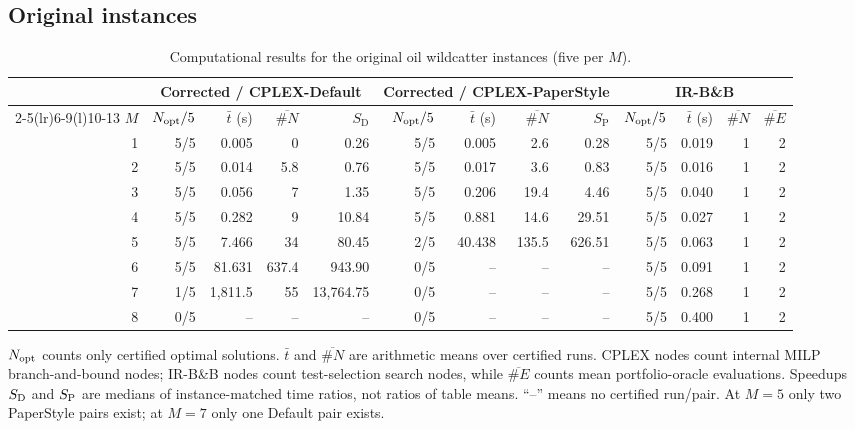 \documentclass[11pt,a4paper]{article}
\begin{document}
\subsection{Original instances}\label{sec:orig}
\begin{table}[H]
\centering
\begin{threeparttable}
\caption{Computational results for the original oil wildcatter instances (five per $M$).}\label{tab:orig}
\setlength{\tabcolsep}{2.5pt}
{\scriptsize
\begin{tabular}{r rrrr rrrr rrrr}
\toprule
 & \multicolumn{4}{c}{Corrected / CPLEX-Default} & \multicolumn{4}{c}{Corrected / CPLEX-PaperStyle} & \multicolumn{4}{c}{IR-B\&B} \\
\cmidrule(lr){2-5}\cmidrule(lr){6-9}\cmidrule(l){10-13}
$M$ & $N_{\rm opt}/5$ & $\bar t$ (s) & $\overline{\#N}$ & $S_\mathrm{D}$
& $N_{\rm opt}/5$ & $\bar t$ (s) & $\overline{\#N}$ & $S_\mathrm{P}$
& $N_{\rm opt}/5$ & $\bar t$ (s) & $\overline{\#N}$ & $\overline{\#E}$ \\
\midrule
1 & 5/5 & 0.005 & 0 & 0.26 & 5/5 & 0.005 & 2.6 & 0.28 & 5/5 & 0.019 & 1 & 2 \\
2 & 5/5 & 0.014 & 5.8 & 0.76 & 5/5 & 0.017 & 3.6 & 0.83 & 5/5 & 0.016 & 1 & 2 \\
3 & 5/5 & 0.056 & 7 & 1.35 & 5/5 & 0.206 & 19.4 & 4.46 & 5/5 & 0.040 & 1 & 2 \\
4 & 5/5 & 0.282 & 9 & 10.84 & 5/5 & 0.881 & 14.6 & 29.51 & 5/5 & 0.027 & 1 & 2 \\
5 & 5/5 & 7.466 & 34 & 80.45 & 2/5 & 40.438 & 135.5 & 626.51 & 5/5 & 0.063 & 1 & 2 \\
6 & 5/5 & 81.631 & 637.4 & 943.90 & 0/5 & -- & -- & -- & 5/5 & 0.091 & 1 & 2 \\
7 & 1/5 & 1,811.5 & 55 & 13,764.75 & 0/5 & -- & -- & -- & 5/5 & 0.268 & 1 & 2 \\
8 & 0/5 & -- & -- & -- & 0/5 & -- & -- & -- & 5/5 & 0.400 & 1 & 2 \\
\bottomrule
\end{tabular}}
\begin{tablenotes}[flushleft]\footnotesize
\item $N_{\rm opt}$ counts only certified optimal solutions. $\bar t$ and $\overline{\#N}$ are arithmetic means over certified runs. CPLEX nodes count internal MILP branch-and-bound nodes; IR-B\&B nodes count test-selection search nodes, while $\overline{\#E}$ counts mean portfolio-oracle evaluations. Speedups $S_{\rm D}$ and $S_{\rm P}$ are medians of instance-matched time ratios, not ratios of table means. ``--'' means no certified run/pair. At $M=5$ only two PaperStyle pairs exist; at $M=7$ only one Default pair exists.
\end{tablenotes}
\end{threeparttable}
\end{table}
\end{document}
